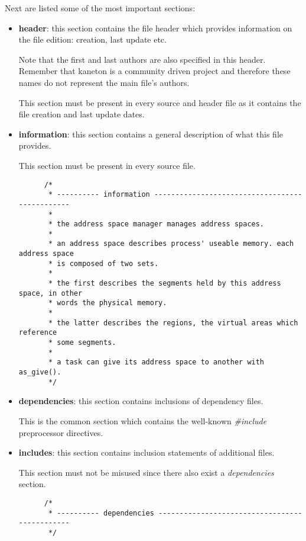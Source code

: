 Next are listed some of the most important sections:

\begin{itemize}
  \item
    \textbf{header}: this section contains the file header which provides
    information on the file edition: creation, last update etc.

    \-

    Note that the first and last authors are also specified in this header.
    Remember that kaneton is a community driven project and therefore these
    names do not represent the main file's authors.

    \-

    This section must be present in every source and header file as it
    contains the file creation and last update dates.
  \item
    \textbf{information}: this section contains a general description of
    what this file provides.

    \-

    This section must be present in every source file.

    \begin{verbatim}
      /*
       * ---------- information -----------------------------------------------
       *
       * the address space manager manages address spaces.
       *
       * an address space describes process' useable memory. each address space
       * is composed of two sets.
       *
       * the first describes the segments held by this address space, in other
       * words the physical memory.
       *
       * the latter describes the regions, the virtual areas which reference
       * some segments.
       *
       * a task can give its address space to another with as_give().
       */
    \end{verbatim}
  \item
    \textbf{dependencies}: this section contains inclusions of dependency
    files.

    \-

    This is the common section which contains the well-known \textit{\#include}
    preprocessor directives.
  \item
    \textbf{includes}: this section contains inclusion statements of additional
    files.

    \-

    This section must not be misused since there also exist a
    \textit{dependencies} section.

    \begin{verbatim}
      /*
       * ---------- dependencies ----------------------------------------------
       */


\end{verbatim}
\end{itemize}
